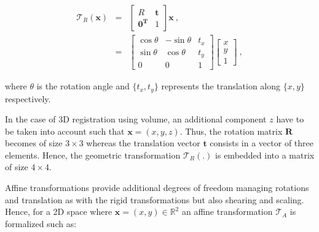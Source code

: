 \begin{eqnarray}
	\mathcal{T}_R(\mathbf{x}) & = & \begin{bmatrix}
		R & \mathbf{t} \\
		\mathbf{0^T} & 1
	\end{bmatrix} \mathbf{x} \ , \nonumber \\
	& = & \begin{bmatrix}
		\cos \theta & -\sin \theta & t_x \\
		\sin \theta & \cos \theta & t_y \\
		0 & 0 & 1
	\end{bmatrix}\begin{bmatrix}
		x \\
		y \\
		1
	\end{bmatrix} \ , \label{eq:rigtra} %
\end{eqnarray}

\noindent where $\theta$ is the rotation angle and $\{ t_x,t_y \}$ represents the translation along $\{x,y\}$ respectively.

In the case of 3D registration using volume, an additional component $z$ have to be taken into account such that $\mathbf{x} = (x,y,z)$. Thus, the rotation matrix $\mathbf{R}$ becomes of size $3 \times 3$ whereas the translation vector $\mathbf{t}$ consists in a vector of three elements. Hence, the geometric transformation $\mathcal{T}_R(.)$ is embedded into a matrix of size $4 \times 4$.

Affine transformations provide additional degrees of freedom managing rotations and translation as with the rigid transformations but also shearing and scaling. Hence, for a 2D space where $\mathbf{x} = (x,y) \in \mathbb{R}^2$ an affine transformation $\mathcal{T}_A$ is formalized such as: 

